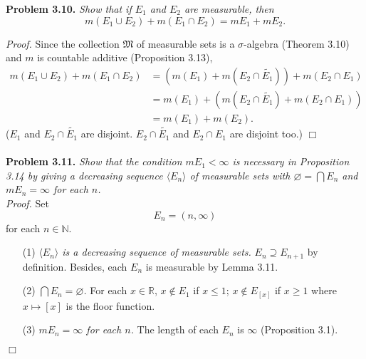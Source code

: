 \documentclass{article}
\begin{document}



\textbf{Problem 3.10.}
\emph{Show that if $E_1$ and $E_2$ are measurable, then
$$m(E_1 \cup E_2) + m(E_1 \cap E_2) = mE_1 + mE_2.$$}



\emph{Proof.}
Since the collection $\mathfrak{M}$ of measurable sets is a $\sigma$-algebra
(Theorem 3.10) and $m$ is countable additive (Proposition 3.13),
\begin{align*}
  m(E_1 \cup E_2) + m(E_1 \cap E_2)
  & = \left( m(E_1) + m(E_2 \cap \widetilde{E_1}) \right) + m(E_2 \cap E_1) \\
  & = m(E_1) + \left( m(E_2 \cap \widetilde{E_1}) + m(E_2 \cap E_1) \right) \\
  & = m(E_1) + m(E_2).
\end{align*}
($E_1$ and $E_2 \cap \widetilde{E_1}$ are disjoint.
$E_2 \cap \widetilde{E_1}$ and $E_2 \cap E_1$ are disjoint too.)
$\Box$ \\\\






\textbf{Problem 3.11.}
\emph{Show that the condition $mE_1 < \infty$ is necessary in Proposition 3.14 by
giving a decreasing sequence $\langle E_n \rangle$ of measurable sets with
$\varnothing = \bigcap E_n$ and $mE_n = \infty$ for each $n$.} \\



\emph{Proof.}
Set $$E_n = (n, \infty)$$ for each $n \in \mathbb{N}$.
\begin{enumerate}
\item[(1)]
  \emph{$\langle E_n \rangle$ is a decreasing sequence of measurable sets.}
  $E_n \supseteq E_{n+1}$ by definition.
  Besides, each $E_n$ is measurable by Lemma 3.11.

\item[(2)]
  \emph{$\bigcap E_n = \varnothing$.}
  For each $x \in \mathbb{R}$, $x \notin E_1$ if $x \leq 1$;
  $x \notin E_{[x]}$ if $x \geq 1$ where $x \mapsto [x]$ is the floor function.

\item[(3)]
  \emph{$mE_n = \infty$ for each $n$.}
  The length of each $E_n$ is $\infty$ (Proposition 3.1).
\end{enumerate}
$\Box$ \\\\
\end{document}
